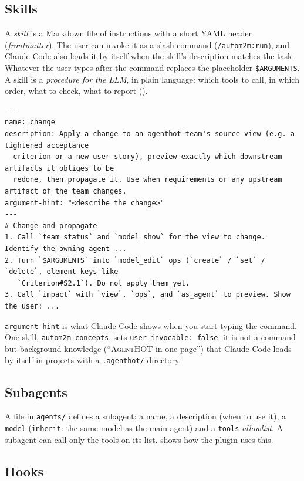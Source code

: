 \documentclass[10pt,a4paper]{article}
\newcommand{\tool}{\textsc{AgentHOT}}
\newcommand{\cc}{Claude Code}
\newcommand{\code}[1]{\texttt{#1}}
\newcommand{\file}[1]{\texttt{#1}}
\newcommand{\skill}[1]{\texttt{/autom2m:#1}}
\begin{document}
\subsection{Skills}

A \emph{skill} is a Markdown file of instructions with a short YAML header
(\emph{frontmatter}). The user can invoke it as a slash command
(\skill{run}), and \cc{} also loads it by itself when the skill's
description matches the task. Whatever the user types after the command
replaces the placeholder \code{\$ARGUMENTS}. A skill is a \emph{procedure
for the LLM}, in plain language: which tools to call, in which order, what to
check, what to report ().

\begin{lstlisting}[style=raw, caption={Code excerpt: the start of \file{skills/change/SKILL.md}.}, label={lst:skill}]
---
name: change
description: Apply a change to an agenthot team's source view (e.g. a tightened acceptance
  criterion or a new user story), preview exactly which downstream artifacts it obliges to be
  redone, then propagate it. Use when requirements or any upstream artifact of the team changes.
argument-hint: "<describe the change>"
---
# Change and propagate
1. Call `team_status` and `model_show` for the view to change. Identify the owning agent ...
2. Turn `$ARGUMENTS` into `model_edit` ops (`create` / `set` / `delete`, element keys like
   `Criterion#S2.1`). Do not apply them yet.
3. Call `impact` with `view`, `ops`, and `as_agent` to preview. Show the user: ...
\end{lstlisting}

\code{argument-hint} is what \cc{} shows when you start typing the command.
One skill, \code{autom2m-concepts}, sets \code{user-invocable: false}: it is
not a command but background knowledge (``\tool{} in one page'') that \cc{}
loads by itself in projects with a \file{.agenthot/} directory.

\subsection{Subagents}

A file in \file{agents/} defines a subagent: a name, a description (when to
use it), a \code{model} (\code{inherit}: the same model as the main agent)
and a \code{tools} \emph{allowlist}. A subagent can call only the tools on
its list.  shows how the plugin uses this.

\subsection{Hooks}
\end{document}
